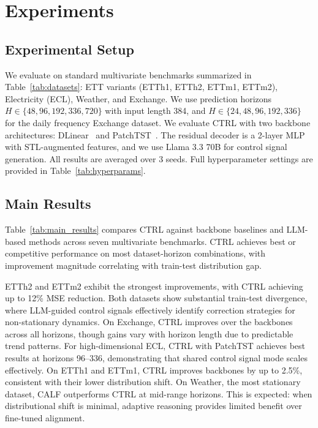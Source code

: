 


\section{Experiments}
\label{sec:experiments}

\subsection{Experimental Setup}

We evaluate on standard multivariate benchmarks summarized in Table~\ref{tab:datasets}: ETT variants (ETTh1, ETTh2, ETTm1, ETTm2), Electricity (ECL), Weather, and Exchange. We use prediction horizons $H \in \{48, 96, 192, 336, 720\}$ with input length 384, and $H \in \{24, 48, 96, 192, 336\}$ for the daily frequency Exchange dataset. We evaluate CTRL with two backbone architectures: DLinear~\cite{Zeng2023DLinear} and PatchTST~\cite{Nie2023PatchTST}. The residual decoder is a 2-layer MLP with STL-augmented features, and we use Llama 3.3 70B for control signal generation. All results are averaged over 3 seeds. Full hyperparameter settings are provided in Table~\ref{tab:hyperparams}.


\subsection{Main Results}
\label{sec:main_results}
Table~\ref{tab:main_results} compares CTRL against backbone baselines and LLM-based methods across seven multivariate benchmarks. CTRL achieves best or competitive performance on most dataset-horizon combinations, with improvement magnitude correlating with train-test distribution gap.

ETTh2 and ETTm2 exhibit the strongest improvements, with CTRL achieving up to 12\% MSE reduction. Both datasets show substantial train-test divergence, where LLM-guided control signals effectively identify correction strategies for non-stationary dynamics.
On Exchange, CTRL improves over the backbones across all horizons, though gains vary with horizon length due to predictable trend patterns. For high-dimensional ECL, CTRL with PatchTST achieves best results at horizons 96--336, demonstrating that shared control signal mode scales effectively. On ETTh1 and ETTm1, CTRL improves backbones by up to 2.5\%, consistent with their lower distribution shift.
On Weather, the most stationary dataset, CALF outperforms CTRL at mid-range horizons. This is expected: when distributional shift is minimal, adaptive reasoning provides limited benefit over fine-tuned alignment.

